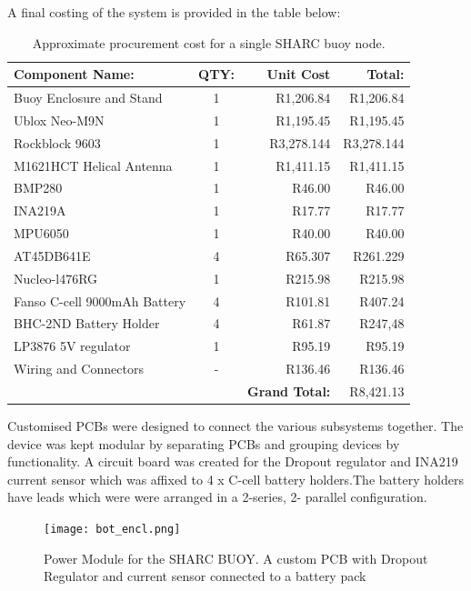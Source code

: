 A final costing of the system is provided in the table below:
\begin{table}[H]
    \centering
    \caption{Approximate procurement cost for a single SHARC buoy node.}
    \begin{tabular}{l c r r}
    \hline \hline
        \textbf{Component Name:} & \textbf{QTY:} & \textbf{Unit Cost} & \textbf{Total:}  \\
        \hline \hline
        Buoy Enclosure and Stand  & 1 & R1,206.84 & R1,206.84 \\
        Ublox Neo-M9N & 1 &  R1,195.45 &R1,195.45\\
        Rockblock 9603 & 1 & R3,278.144 & R3,278.144 \\
        M1621HCT Helical Antenna & 1 & R1,411.15 & R1,411.15 \\
        BMP280 & 1 & R46.00 & R46.00 \\
        INA219A & 1 & R17.77 & R17.77 \\
        MPU6050 & 1 & R40.00 & R40.00 \\
        AT45DB641E & 4 & R65.307 & R261.229 \\
        Nucleo-l476RG & 1 & R215.98 & R215.98 \\
        Fanso C-cell 9000mAh Battery & 4 & R101.81 & R407.24 \\
        BHC-2ND Battery Holder & 4 & R61.87 & R247,48 \\
        LP3876 5V regulator & 1 & R95.19 & R95.19 \\
        Wiring and Connectors & - & R136.46 & R136.46 \\
        \hline 
        \hline
        & & \textbf{ Grand Total: } & R8,421.13\\ 
        \hline \hline
    \end{tabular}
    \label{tab:total_cost}
\end{table}

Customised PCBs were designed to connect the various subsystems together. The device was kept modular by separating PCBs and grouping devices by functionality. A circuit board was created for the Dropout regulator and INA219 current sensor which was affixed to 4 x C-cell battery holders.The battery holders have leads which were were arranged in a 2-series, 2- parallel configuration.

\begin{figure}[H]
    \centering
    \texttt{[image: bot\_encl.png]}
    \caption{Power Module for the SHARC BUOY. A custom PCB with Dropout Regulator and current sensor connected to a battery pack}
    \label{fig:bot_elec}
\end{figure}

